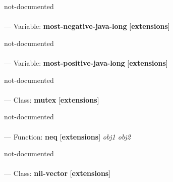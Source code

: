 \begin{adjustwidth}{5em}{5em}
not-documented
\end{adjustwidth}

\paragraph{}
\label{EXTENSIONS:MOST-NEGATIVE-JAVA-LONG}
--- Variable: \textbf{most-negative-java-long} [\textbf{extensions}] \textit{}

\begin{adjustwidth}{5em}{5em}
not-documented
\end{adjustwidth}

\paragraph{}
\label{EXTENSIONS:MOST-POSITIVE-JAVA-LONG}
--- Variable: \textbf{most-positive-java-long} [\textbf{extensions}] \textit{}

\begin{adjustwidth}{5em}{5em}
not-documented
\end{adjustwidth}

\paragraph{}
\label{EXTENSIONS:MUTEX}
--- Class: \textbf{mutex} [\textbf{extensions}] \textit{}

\begin{adjustwidth}{5em}{5em}
not-documented
\end{adjustwidth}

\paragraph{}
\label{EXTENSIONS:NEQ}
--- Function: \textbf{neq} [\textbf{extensions}] \textit{obj1 obj2}

\begin{adjustwidth}{5em}{5em}
not-documented
\end{adjustwidth}

\paragraph{}
\label{EXTENSIONS:NIL-VECTOR}
--- Class: \textbf{nil-vector} [\textbf{extensions}] \textit{}

